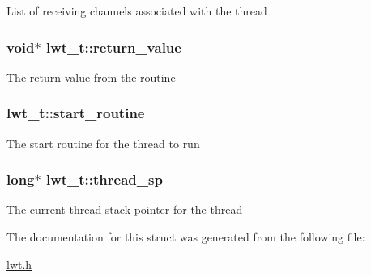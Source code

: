 List of receiving channels associated with the thread \hypertarget{structlwt_a22ac5beef8503481294035218e73c3ef}{
\subsubsection[{return\+\_\+value}]{\setlength{\rightskip}{0pt plus 5cm}void$\ast$ lwt\+\_\+t\+::return\+\_\+value}}\label{structlwt_a22ac5beef8503481294035218e73c3ef}
The return value from the routine \hypertarget{structlwt_acdcfc344e943154b9d3d11e1a41cb9f1}{
\subsubsection[{start\+\_\+routine}]{ lwt\+\_\+t\+::start\+\_\+routine}}\label{structlwt_acdcfc344e943154b9d3d11e1a41cb9f1}
The start routine for the thread to run \hypertarget{structlwt_aba48cdf2f962d7ededf74923ddd33ea1}{
\subsubsection[{thread\+\_\+sp}]{\setlength{\rightskip}{0pt plus 5cm}long$\ast$ lwt\+\_\+t\+::thread\+\_\+sp}}\label{structlwt_aba48cdf2f962d7ededf74923ddd33ea1}
The current thread stack pointer for the thread 

The documentation for this struct was generated from the following file\+:\begin{DoxyCompactItemize}
\item 
\hyperlink{lwt_8h}{lwt.\+h}\end{DoxyCompactItemize}
